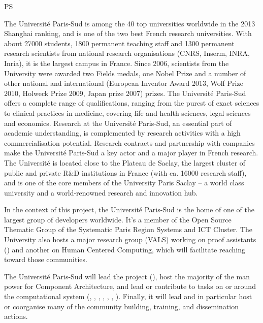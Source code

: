 \begin{sitedescription}{PS} \label{desc:ParisSud}

The Université Paris-Sud is among the 40 top universities worldwide in the
2013 Shanghai ranking, and is one of the two best French research
universities. With about 27000 students, 1800 permanent teaching staff
and 1300 permanent research scientists from national research
organisations (CNRS, Inserm, INRA, Inria), it is the largest campus in
France. Since 2006, scientists from the University were awarded two
Fields medals, one Nobel Prize and a number of other national and international
(European Inventor Award 2013, Wolf Prize 2010, Holweck Prize 2009,
Japan prize 2007) prizes.  The Université Paris-Sud offers a
complete range of qualifications, ranging from the purest of exact
sciences to clinical practices in medicine, covering life and health
sciences, legal sciences and economics. Research at the Université
Paris-Sud, an essential part of academic understanding, is
complemented by research activities with a high commercialisation
potential. Research contracts and partnership with companies make the
Université Paris-Sud a key actor and a major player in French
research.  The Université is located close to the Plateau de Saclay,
the largest cluster of public and private R\&D institutions in France
(with ca. 16000 research staff), and is one of the core members of the
University Paris Saclay – a world class university and a
world-renowned research and innovation hub.

In the context of this project, the Université Paris-Sud is the
home of one of the largest group of \Sage developers worldwide.
It's a member of the Open Source Thematic Group of the Systematic
Paris Region Systems and ICT Cluster. The University also hosts a
major research group (VALS) working on proof assistants () and
another on Human Centered Computing, which will facilitate reaching
toward those communities.

The Université Paris-Sud will lead the project (),
host the majority of the man power for 
Component Architecture, and lead or contribute to tasks on or around the \Sage
computational system (,
,
, ,
, ,
). Finally, it will lead  and in
particular host or coorganise many of the community building,
training, and dissemination actions.


\end{sitedescription}
